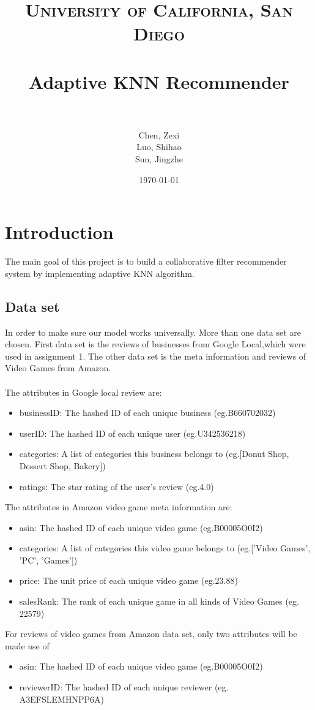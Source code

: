\documentclass[paper=a4, fontsize=11pt, twocolumn]{scrartcl} %
\title{	
\normalfont \normalsize 
\textsc{University of California, San Diego} \\ [25pt] %
\horrule{0.5pt} \\[0.4cm] %
\huge Adaptive KNN Recommender \\ %
\horrule{2pt} \\[0.5cm] %
}
\author{Chen, Zexi\\Luo, Shihao\\Sun, Jingzhe}
\date{\normalsize\today} %
\numberwithin{equation}{section} %
\numberwithin{figure}{section} %
\numberwithin{table}{section} %
\begin{document}
\maketitle %

\section{Introduction}

The main goal of this project is to build a collaborative filter recommender system by implementing adaptive KNN algorithm. 

\subsection{Data set} 
In order to make sure our model works universally. More than one data set are chosen. First data set is the reviews of businesses from Google Local,which were used in assignment 1. The other data set is the meta information and reviews of Video Games from Amazon.\\
\\
The attributes in Google local review are:
\begin{itemize}
	\item businessID: The hashed ID of each unique business (eg.B660702032)
	\item userID: The hashed ID of each unique user (eg.U342536218)
	\item categories: A list of categories this business belongs to (eg.[Donut Shop, Dessert Shop, Bakery])
	\item ratings: The star rating of the user's review (eg.4.0)
\end{itemize}

The attributes in Amazon video game meta information are:
\begin{itemize}
	\item asin: The hashed ID of each unique video game (eg.B00005O0I2)
	\item categories: A list of categories this video game belongs to (eg.['Video Games', 'PC', 'Games'])
	\item price: The unit price of each unique video game (eg.23.88)
	\item salesRank: The rank of each unique game in all kinds of Video Games (eg. 22579)
\end{itemize}

For reviews of video games from Amazon data set, only two attributes will be made use of
\begin{itemize}
	\item asin: The hashed ID of each unique video game (eg.B00005O0I2)
	\item reviewerID: The hashed ID of each unique reviewer (eg. A3EFSLEMHNPP6A)
\end{itemize}
\end{document}
